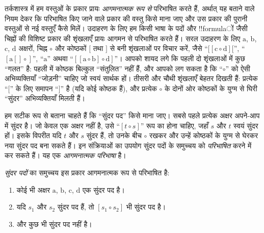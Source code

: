 \documentclass[../../../include/open-logic-section]{subfiles}
\begin{document}


तर्कशास्त्र में हम वस्तुओं के प्रकार प्रायः \emph{आगमनात्मक रूप से}
परिभाषित करते हैं, अर्थात् यह बताने वाले नियम देकर कि परिभाषित किए जाने
वाले प्रकार की वस्तु किसे माना जाए और उस प्रकार की पुरानी वस्तुओं से नई
वस्तुएँ कैसे मिलें। उदाहरण के लिए हम किसी भाषा के पदों और !!{formula}ों
जैसी चिह्नों की विशिष्ट प्रकार की शृंखलाएँ प्रायः आगमन से परिभाषित करते हैं।
सरल उदाहरण के लिए $\mathrm{a}$, $\mathrm{b}$, $\mathrm{c}$,
$\mathrm{d}$ अक्षरों, चिह्न $\circ$ और कोष्ठकों $[$ तथा $]$ से बनी
शृंखलाओं पर विचार करें, जैसे ``$[[\mathrm{c}\circ\mathrm{d}][$'',
``$[\mathrm{a}[]\circ]$'', ``$\mathrm{a}$'' अथवा
``$[[\mathrm{a}\circ\mathrm{b}]\circ\mathrm{d}]$''। आपको शायद लगे कि
पहली दो शृंखलाओं में कुछ ``गलत'' है: पहली में कोष्ठक बिल्कुल ``संतुलित''
नहीं हैं, और आपको लग सकता है कि ``$\circ$'' को ऐसी अभिव्यक्तियाँ ``जोड़नी''
चाहिए जो स्वयं सार्थक हों। तीसरी और चौथी शृंखलाएँ बेहतर दिखती हैं: प्रत्येक
``$[$'' के लिए समापन ``$]$'' है (यदि कोई कोष्ठक हैं), और प्रत्येक $\circ$
के दोनों ओर कोष्ठकों के युग्म से घिरी ``सुंदर'' अभिव्यक्तियाँ मिलती हैं।

हम सटीक रूप से बताना चाहते हैं कि ``सुंदर पद'' किसे माना जाए। सबसे पहले
प्रत्येक अक्षर अपने-आप में सुंदर है। जो केवल एक अक्षर नहीं है, उसे
``$[t\circ s]$'' रूप का होना चाहिए, जहाँ $s$ और $t$ स्वयं सुंदर हों। इसके
विपरीत यदि $t$ और $s$ सुंदर हैं, तो उनके बीच $\circ$ रखकर और उन्हें
कोष्ठकों के युग्म से घेरकर नया सुंदर पद बना सकते हैं। इन संक्रियाओं का उपयोग
सुंदर पदों के समुच्चय को \emph{परिभाषित} करने में कर सकते हैं। यह एक
\emph{आगमनात्मक परिभाषा} है।

\begin{defn}[सुंदर पद]
  \emph{सुंदर पदों} का समुच्चय इस प्रकार आगमनात्मक रूप से परिभाषित है:
  \begin{enumerate}
  \item कोई भी अक्षर $\mathrm{a}$, $\mathrm{b}$, $\mathrm{c}$,
    $\mathrm{d}$ एक सुंदर पद है।
  \item यदि $s_1$ और $s_2$ सुंदर पद हैं, तो $[s_1\circ s_2]$ भी सुंदर पद
    है।
  \item और कुछ भी सुंदर पद नहीं है।
  \end{enumerate}
\end{defn}
\end{document}
